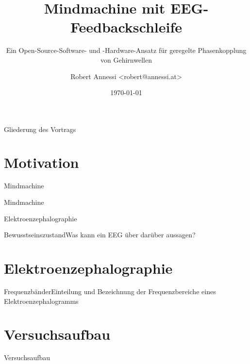 \documentclass[hyperref={pdfpagelabels=false}]{beamer}
\title {Mindmachine mit EEG-Feedbackschleife}
\subtitle {Ein Open-Source-Software- und -Hardware-Ansatz für geregelte Phasenkopplung von Gehirnwellen}
\author{Robert Annessi <robert@annessi.at>}
\date{\customdate\today}
\begin{document}
\begin{frame}
  \titlepage
\end{frame}
\logo{}


\begin{frame}{Gliederung des Vortrags}
  \tableofcontents
\end{frame}


\section{Motivation}
\begin{frame}{Mindmachine}
\begin{center}
\end{center}
\end{frame}
\begin{frame}{Mindmachine}
\begin{center}
\end{center}
\end{frame}

\begin{frame}{Elektroenzephalographie}
\begin{center}
\end{center}
\end{frame}

\begin{frame}{Bewusstseinszustand}{Was kann ein EEG über darüber aussagen?}
\begin{center}
\end{center}
\end{frame}

\section{Elektroenzephalographie}
\begin{frame}{Frequenzbänder}{Einteilung und Bezeichnung der Frequenzbereiche eines Elektroenzephalogramms}
\begin{center}
\end{center}
\end{frame}

\section{Versuchsaufbau}
\begin{frame}{Versuchsaufbau}
\begin{center}
\end{center}
\vspace{1cm}
\end{frame}
\end{document}

